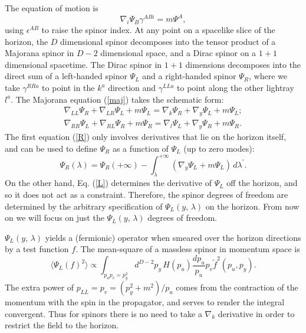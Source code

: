 \documentclass[12pt]{article}
\begin{document}
The equation of motion is
\begin{equation}\label{maj}
\nabla_i \Psi_B \gamma^{ABi} = m \Psi^A,
\end{equation}
using $\epsilon^{AB}$ to raise the spinor index.  At any point on a spacelike slice of the horizon, the $D$ dimensional spinor decomposes into the tensor product of a Majorana spinor in $D - 2$ dimensional space, and a Dirac spinor on a $1 + 1$ dimensional spacetime.  The Dirac spinor in $1 + 1$ dimensions decomposes into the direct sum of a left-handed spinor $\Psi_L$ and a right-handed spinor $\Psi_R$, where we take $\gamma^{RRa}$ to point in the $k^a$ direction and $\gamma^{LLa}$ to point along the other lightray $l^a$.  The Majorana equation (\ref{maj}) takes the schematic form:
\begin{eqnarray}
\nabla_{LL} \Psi_R + \nabla_{LR} \Psi_L + m \Psi_L
= \nabla_k \Psi_R + \nabla_y \Psi_L + m \Psi_L \label{L}; \\
\nabla_{RR} \Psi_L + \nabla_{RL} \Psi_R + m \Psi_R
= \nabla_l \Psi_L + \nabla_y \Psi_R + m \Psi_R.\label{R}
\end{eqnarray}
The first equation (\ref{R}) only involves derivatives that lie on the horizon itself, and can be used to define $\Psi_R$ as a function of $\Psi_L$ (up to zero modes):
\begin{equation}
\Psi_R(\lambda) =
\Psi_R(+\infty) - \int_\lambda^{+\infty} (\nabla_y \Psi_L + m \Psi_L)\,d\lambda^\prime.
\end{equation}
On the other hand, Eq. (\ref{L}) determines the derivative of $\Psi_L$ off the horizon, and so it does not act as a constraint.  Therefore, the spinor degrees of freedom are determined by the arbitrary specification of $\Psi_L(y,\,\lambda)$ on the horizon.  From now on we will focus on just the $\Psi_L(y,\,\lambda)$ degrees of freedom.

$\Psi_L(y,\,\lambda)$ yields a (fermionic) operator when smeared over the horizon directions by a test function $f$.  The mean-square of a massless spinor in momentum space is
\begin{equation}
\langle \Psi_L(f)^2 \rangle \propto
\int_{p_u p_v = p_y^2} d^{D-2}p_y\,H(p_u)\frac{dp_u}{p_u} p_v \tilde{f}^2(p_u, p_y).
\end{equation}
The extra power of $p_{LL} = p_v = (p_y^2 + m^2)/ p_u$ comes from the contraction of the momentum with the spin in the propagator, and serves to render the integral convergent.  Thus for spinors there is no need to take a $\nabla_k$ derivative in order to restrict the field to the horizon.
\end{document}
